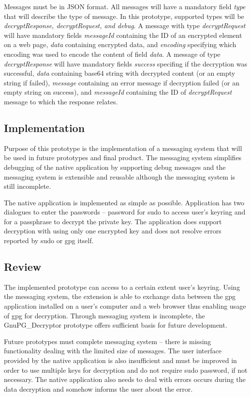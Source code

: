 Messages must be in JSON format. All messages will have a mandatory field \textit{type} that will describe the type of message. In this prototype, supported types will be \textit{decryptResponse, decryptRequest, and debug}. A message with type \textit{decryptRequest} will have mandatory fields \textit{messageId} containing the ID of an encrypted element on a web page, \textit{data} containing encrypted data, and \textit{encoding} specifying which encoding was used to encode the content of field \textit{data}. A message of type \textit{decryptResponse} will have mandatory fields \textit{success} specifing if the decryption was successful, \textit{data} containing base64 string with decrypted content (or an empty string if failed), \textit{message} containing an error message if decryption failed (or an empty string on success), and \textit{messageId} containing the ID of \textit{decryptRequest} message to which the response relates.

\subsection{Implementation}
Purpose of this prototype is the implementation of a messaging system that will be used in future prototypes and final product. The messaging system simplifies debugging of the native application by supporting debug messages and the messaging system is extensible and reusable although the messaging system is still incomplete.

The native application is implemented as simple as possible. Application has two dialogues to enter the passwords -- password for sudo to access user's keyring and for a passphrase to decrypt the private key. The application does support decryption with using only one encrypted key and does not resolve errors reported by sudo or gpg itself.

\subsection{Review}
The implemented prototype can access to a certain extent user's keyring. Using the messaging system, the extension is able to exchange data between the gpg application installed on a user's computer and a web browser thus enabling usage of gpg for decryption. Through messaging system is incomplete, the GnuPG\_Decryptor prototype offers sufficient basis for future development.

Future prototypes must complete messaging system -- there is missing functionality dealing with the limited size of messages. The user interface provided by the native application is also insufficient and must be improved in order to use multiple keys for decryption and do not require sudo password, if not necessary. The native application also needs to deal with errors occurs during the data decryption and somehow informs the user about the error.

